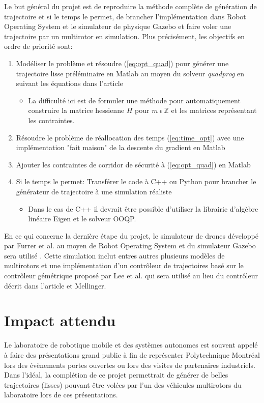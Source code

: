 Le but général du projet est de reproduire la méthode complète de génération de trajectoire et si le temps le permet, de brancher l'implémentation dans Robot Operating System et le simulateur de physique Gazebo et faire voler une trajectoire par un multirotor en simulation. Plus précisément, les objectifs en ordre de priorité sont:
\begin{enumerate}
	\item Modéliser le problème et résoudre (\ref{eq:opt_quad}) pour générer une trajectoire lisse préléminaire en Matlab au moyen du solveur \textit{quadprog} en suivant les équations dans l'article
		\begin{itemize}
			\item La difficulté ici est de formuler une méthode pour automatiquement construire la matrice hessienne $H$ pour $m \  \epsilon \ \mathbb{Z}$ et les matrices représentant les contraintes.
		\end{itemize}
	\item Résoudre le problème de réallocation des temps (\ref{eq:time_opt}) avec une implémentation "fait maison" de la descente du gradient en Matlab
	\item Ajouter les contraintes de corridor de sécurité à (\ref{eq:opt_quad}) en Matlab
	\item Si le temps le permet: Transférer le code à C++ ou Python pour brancher le générateur de trajectoire à une simulation réaliste
		\begin{itemize}
			\item Dans le cas de C++ il devrait être possible d'utiliser la librairie d'algèbre linéaire Eigen et le solveur OOQP.
		\end{itemize}
\end{enumerate}

En ce qui concerne la dernière étape du projet, le simulateur de drones développé par Furrer et al. au moyen de Robot Operating System et du simulateur Gazebo sera utilisé \cite{Furrer2016}. Cette simulation inclut entres autres plusieurs modèles de multirotors et une implémentation d'un contrôleur de trajectoires basé sur le contrôleur gémétrique proposé par Lee et al. \cite{Lee2010} qui sera utilisé au lieu du contrôleur décrit dans l'article et Mellinger.

\section{Impact attendu}

Le laboratoire de robotique mobile et des systèmes autonomes est souvent appelé à faire des présentations grand public à fin de représenter Polytechnique Montréal lors des évènements portes ouvertes ou lors des visites de partenaires industriels. Dans l'idéal, la complétion de ce projet permettrait de générer de belles trajectoires (lisses) pouvant être volées par l'un des véhicules multirotors du laboratoire lors de ces présentations.

